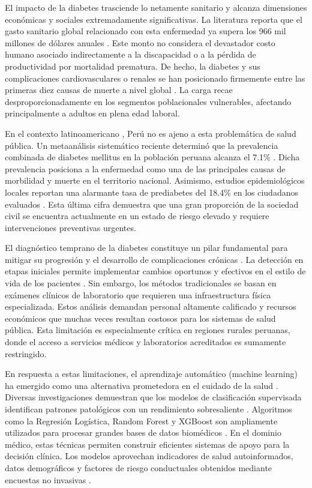 \documentclass[journal]{IEEEtran}
\begin{document}
El impacto de la diabetes trasciende lo netamente sanitario y alcanza dimensiones económicas y sociales extremadamente significativas. La literatura reporta que el gasto sanitario global relacionado con esta enfermedad ya supera los 966 mil millones de dólares anuales \cite{Ong2023}. Este monto no considera el devastador costo humano asociado indirectamente a la discapacidad o a la pérdida de productividad por mortalidad prematura. De hecho, la diabetes y sus complicaciones cardiovasculares o renales se han posicionado firmemente entre las primeras diez causas de muerte a nivel global \cite{Ong2023}. La carga recae desproporcionadamente en los segmentos poblacionales vulnerables, afectando principalmente a adultos en plena edad laboral.

En el contexto latinoamericano \cite{Cousin2022}, Perú no es ajeno a esta problemática de salud pública. Un metaanálisis sistemático reciente determinó que la prevalencia combinada de diabetes mellitus en la población peruana alcanza el 7.1\% \cite{Vera-Ponce2025}. Dicha prevalencia posiciona a la enfermedad como una de las principales causas de morbilidad y muerte en el territorio nacional. Asimismo, estudios epidemiológicos locales reportan una alarmante tasa de prediabetes del 18.4\% en los ciudadanos evaluados \cite{Vera-Ponce2025}. Esta última cifra demuestra que una gran proporción de la sociedad civil se encuentra actualmente en un estado de riesgo elevado y requiere intervenciones preventivas urgentes.

El diagnóstico temprano de la diabetes constituye un pilar fundamental para mitigar su progresión y el desarrollo de complicaciones crónicas \cite{Yang2025, Ma2025}. La detección en etapas iniciales permite implementar cambios oportunos y efectivos en el estilo de vida de los pacientes \cite{Gndodu2023}. Sin embargo, los métodos tradicionales se basan en exámenes clínicos de laboratorio que requieren una infraestructura física especializada. Estos análisis demandan personal altamente calificado y recursos económicos que muchas veces resultan costosos para los sistemas de salud pública. Esta limitación es especialmente crítica en regiones rurales peruanas, donde el acceso a servicios médicos y laboratorios acreditados es sumamente restringido.

En respuesta a estas limitaciones, el aprendizaje automático (machine learning) ha emergido como una alternativa prometedora en el cuidado de la salud \cite{Khokhar2024}. Diversas investigaciones demuestran que los modelos de clasificación supervisada identifican patrones patológicos con un rendimiento sobresaliente \cite{Islam2025a}. Algoritmos como la Regresión Logística, Random Forest y XGBoost son ampliamente utilizados para procesar grandes bases de datos biomédicos \cite{AliKsm2025, ElSofany2024}. En el dominio médico, estas técnicas permiten construir eficientes sistemas de apoyo para la decisión clínica. Los modelos aprovechan indicadores de salud autoinformados, datos demográficos y factores de riesgo conductuales obtenidos mediante encuestas no invasivas \cite{Chowdhury2024}.
\end{document}
